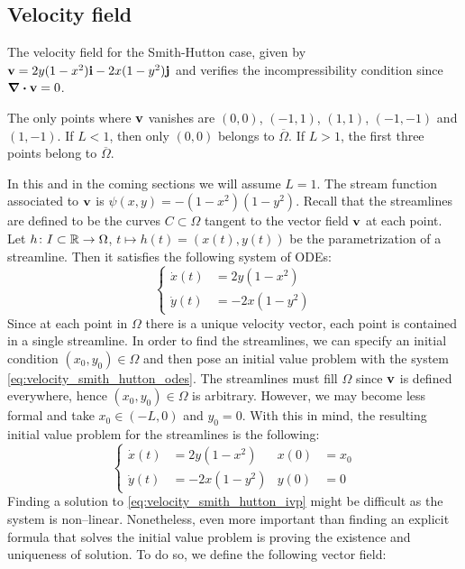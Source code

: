 
\subsection{Velocity field}

The velocity field for the Smith-Hutton case, given by $\vb{v} = 2 y (1 - x^2) \vb{i} - 2 x (1 - y^2) \vb{j}$ and verifies the incompressibility condition since $\div{\vb{v}} = 0$. 

The only points where $\vb{v}$ vanishes are $(0,0)$, $(-1,1)$, $(1,1)$, $(-1,-1)$ and $(1,-1)$. If $L < 1$, then only $(0,0)$ belongs to $\overline{\Omega}$. If $L > 1$, the first three points belong to $\overline{\Omega}$. 

In this and in the coming sections we will assume $L = 1$. The stream function associated to $\vb{v}$ is $\psi(x,y) = -(1-x^2)(1-y^2)$. Recall that the streamlines are defined to be the curves $C \subset \Omega$ tangent to the vector field $\vb{v}$ at each point. Let $h \colon I \subset \mathbb{R} \to \Omega$, $t \mapsto h(t) = (x(t), y(t))$ be the parametrization of a streamline. Then it satisfies the following system of ODEs:
\begin{equation} \label{eq:velocity_smith_hutton_odes}
	\left\{
	\begin{aligned}
		\dot{x}(t) &= 2 y (1 - x^2) \\
		\dot{y}(t) &= - 2 x (1 - y^2)
	\end{aligned}
	\right.
\end{equation}
Since at each point in $\Omega$ there is a unique velocity vector, each point is contained in a single streamline. In order to find the streamlines, we can specify an initial condition $(x_0, y_0) \in \Omega$ and then pose an initial value problem with the system \eqref{eq:velocity_smith_hutton_odes}. The streamlines must fill $\Omega$ since $\vb{v}$ is defined everywhere, hence $(x_0, y_0) \in \Omega$ is arbitrary. However, we may become less formal and take $x_0 \in (-L, 0)$ and $y_0 = 0$. With this in mind, the resulting initial value problem for the streamlines is the following:
\begin{equation} \label{eq:velocity_smith_hutton_ivp}
	\left\{
	\begin{aligned}
		\dot{x}(t) &= 2 y (1 - x^2) 	&	x(0) &= x_0 \\
		\dot{y}(t) &= - 2 x (1 - y^2)	&	y(0) &= 0
	\end{aligned}
	\right.
\end{equation}
Finding a solution to \eqref{eq:velocity_smith_hutton_ivp} might be difficult as the system is non--linear. Nonetheless, even more important than finding an explicit formula that solves the initial value problem is proving the existence and uniqueness of solution. To do so, we define the following vector field:
